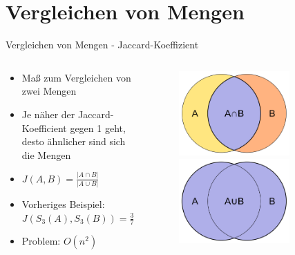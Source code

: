 \section{Vergleichen von Mengen}

\begin{frame}{Vergleichen von Mengen - Jaccard-Koeffizient}
    \begin{columns} %
        \begin{column}{.60\textwidth}
            \begin{itemize}
                \item Maß zum Vergleichen von zwei Mengen \pause
                \item Je näher der Jaccard-Koefficient gegen 1 geht, desto ähnlicher sind sich die Mengen \pause
                \item $ J(A,B) = \frac{ | A \cap B | }{ | A \cup B | } $ \pause
                \item Vorheriges Beispiel: $ J(S_3(A),S_3(B)) = \frac{3}{7} \approx 0.43 $ \pause
                \item Problem: $ O(n^2) $ \pause
            \end{itemize}
        \end{column}
        \hfill
        \begin{column}{.40\textwidth}
            \begin{figure}[H]
                \centering
                \includegraphics[width=0.75\textwidth]{images/Intersection_of_sets_A_and_B.png} 
                \includegraphics[width=0.75\textwidth]{images/Union_of_sets_A_and_B.png}

\end{figure}
\end{column}
\end{columns}
\end{frame}
